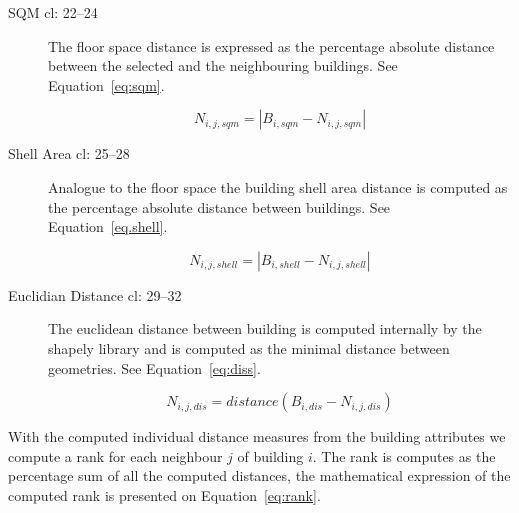 \begin{description}
    \item[SQM cl: 22--24] The floor space distance is expressed as the
        percentage absolute distance between the selected and the neighbouring
        buildings. See Equation~\ref{eq:sqm}.

\begin{equation}\label{eq:sqm}
    N_{i,j,sqm} = \left| B_{i,sqm} - N_{i,j,sqm} \right|
\end{equation}

    \item[Shell Area cl: 25--28] Analogue to the floor space the building shell
        area distance is computed as the percentage absolute distance between
        buildings. See Equation~\ref{eq.shell}.

\begin{equation}\label{eq:shell}
    N_{i,j,shell} = \left| B_{i,shell} - N_{i,j,shell} \right|
\end{equation}

    \item[Euclidian Distance cl: 29--32] The euclidean distance between
        building is computed internally by the shapely library and is computed
        as the minimal distance between geometries. See Equation~\ref{eq:diss}.

\begin{equation}\label{eq:diss}
    N_{i,j,dis} = distance(B_{i,dis} - N_{i,j,dis})
\end{equation}

\end{description}


%

With the computed individual distance measures from the building attributes we
compute a rank for each neighbour $j$ of building $i$. The rank is computes as
the percentage sum of all the computed distances, the mathematical expression
of the computed rank is presented on Equation~\ref{eq:rank}.

